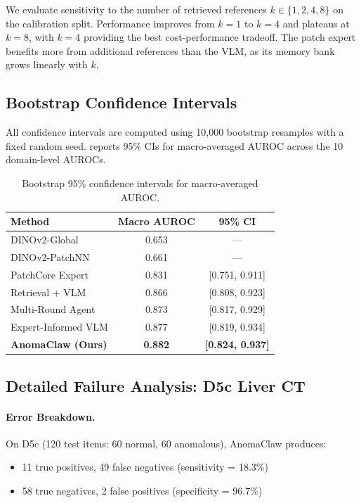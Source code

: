 We evaluate sensitivity to the number of retrieved references $k \in \{1, 2, 4, 8\}$ on the calibration split. Performance improves from $k=1$ to $k=4$ and plateaus at $k=8$, with $k=4$ providing the best cost-performance tradeoff. The patch expert benefits more from additional references than the VLM, as its memory bank grows linearly with $k$.


\subsection{Bootstrap Confidence Intervals}
\label{app:bootstrap}

All confidence intervals are computed using 10{,}000 bootstrap resamples with a fixed random seed.  reports 95\% CIs for macro-averaged AUROC across the 10 domain-level AUROCs.

\begin{table}[h]
\centering
\caption{Bootstrap 95\% confidence intervals for macro-averaged AUROC.}
\label{tab:all_cis}
\begin{tabular}{lcc}
\toprule
\textbf{Method} & \textbf{Macro AUROC} & \textbf{95\% CI} \\
\midrule
DINOv2-Global & 0.653 & --- \\
DINOv2-PatchNN & 0.661 & --- \\
PatchCore Expert & 0.831 & [0.751, 0.911] \\
Retrieval + VLM & 0.866 & [0.808, 0.923] \\
Multi-Round Agent & 0.873 & [0.817, 0.929] \\
Expert-Informed VLM & 0.877 & [0.819, 0.934] \\
\textbf{AnomaClaw (Ours)} & \textbf{0.882} & \textbf{[0.824, 0.937]} \\
\bottomrule
\end{tabular}
\end{table}

\subsection{Detailed Failure Analysis: D5c Liver CT}
\label{app:d5c_failure}

\paragraph{Error Breakdown.}
On D5c (120 test items: 60 normal, 60 anomalous), AnomaClaw produces:
\begin{itemize}[leftmargin=*,itemsep=1pt]
    \item 11 true positives, 49 false negatives (sensitivity = 18.3\%)
    \item 58 true negatives, 2 false positives (specificity = 96.7\%)
\end{itemize}

